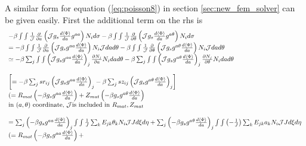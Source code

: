 \documentclass{report}
\newcommand{\bm}[1]{\mbox{\boldmath $#1$}}
\newcommand{\ff}[2]{\frac{#1}{#2}}
\newcommand{\pp}[2]{\frac{\partial{#1}}{\partial{#2}}}
\begin{document}
A similar form for equation (\ref{eq:poisson8}) in section \ref{sec:new_fem_solver} 
can be given easily.
First the additional term on the rhs is
$$
\begin{array}{l}
  - \beta \int\int \ff{1}{\cal J} \pp{}{a} \left(
           {\cal J} g_s \ff{d\langle \Phi \rangle}{da} g^{aa}
                                           \right) N_i d\sigma
  - \beta \int\int \ff{1}{\cal J} \pp{}{\theta} \left(
           {\cal J} g_s \ff{d\langle \Phi \rangle}{da} g^{a\theta}
                                                \right) N_i d\sigma
\\
= - \beta \int\int \ff{1}{\cal J} \pp{}{a} \left(
           {\cal J} g_s g^{aa} \ff{d\langle \Phi \rangle}{da}
                                           \right) N_i {\cal J} dad\theta
  - \beta \int\int \ff{1}{\cal J} \pp{}{\theta} \left(
           {\cal J} g_s g^{a\theta} \ff{d\langle \Phi \rangle}{da}
                                                \right) N_i {\cal J} dad\theta
\\
\simeq - \beta \sum_j \int\int \left( {\cal J} g_s g^{aa} \ff{d\langle \Phi \rangle}{da} \right)_j
                        \pp{N_j}{a} N_i dad\theta
       - \beta \sum_j \int\int \left( {\cal J} g_s g^{a\theta} \ff{d\langle \Phi \rangle}{da} \right)_j
                       \pp{N_j}{\theta} N_i dad\theta
\\
\\
\left[ = - \beta \sum_j sr_{ij} \left( {\cal J} g_s g^{aa} \ff{d\langle \Phi \rangle}{da} \right)_j
  - \beta  \sum_j sz_{ij} \left( {\cal J} g_s g^{a\theta} \ff{d\langle \Phi \rangle}{da} \right)_j \right]
\\
 (=R_{mat} \left( -\beta g_s g^{aa} \ff{d\langle \Phi \rangle}{da} \right) + 
   Z_{mat} \left( -\beta g_s g^{a\theta} \ff{d\langle \Phi \rangle}{da} \right)
\\
\mbox{in } (a, \theta) \mbox{ coordinate, } {\cal J} \mbox{is included in } R_{mat} , Z_{mat}
\\
\\
=\sum_j \left( -\beta g_s g^{aa} \ff{d\langle \Phi \rangle}{da} \right)_j
         \int\int \ff{1}{J} \sum_k E_{jk} \theta_k N_i {\cal J} J d\xi d\eta 
+
 \sum_j \left( -\beta g_s g^{a\theta} \ff{d\langle \Phi \rangle}{da} \right)_j
         \int\int \left(-\ff{1}{J}\right) \sum_k E_{jk} a_k N_i {\cal J} J d\xi d\eta 
\\
 (=R_{mat} \left( -\beta g_s g^{aa} \ff{d\langle \Phi \rangle}{da} \right) + 

\end{array}$$
\end{document}
